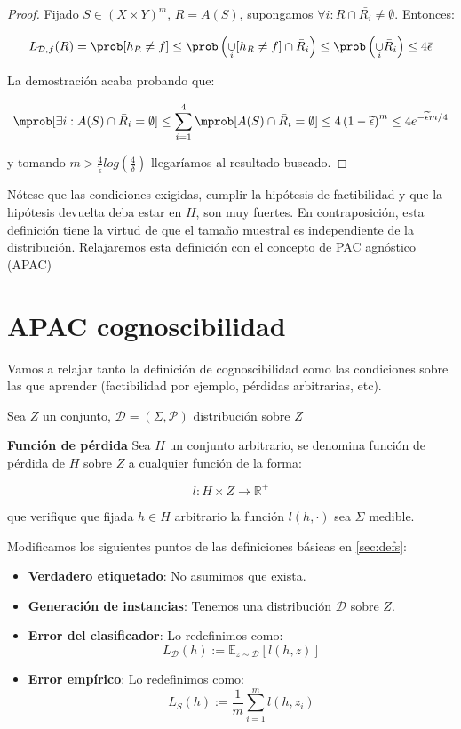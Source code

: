 \begin{example}
\begin{proof}
    Fijado $S\in (X\times Y)^m$, $R=A(S)$, supongamos $\forall i : R \cap \bar{R_i} \neq \emptyset$. Entonces:

    \[L_{\mathcal{D},f}(R) = \prob [h_R \neq f] \le \prob 
    \left(\underset{i}{\cup} [h_R \neq f] \cap \bar{R}_i\right) \le \prob \left(\underset{i}{\cup} 
    \bar{R}_i\right) \le 4 \bar{\epsilon}\]

    La demostración acaba probando que:

    \[\mprob [\exists i : A(S)\cap \bar{R}_i = \emptyset] \le \sum_{i=1}^4 
    \mprob[A(S)\cap \bar{R}_i = \emptyset] \le 4 \left(1-\widetilde{\epsilon} \right)^m \le 4e^{-\widetilde{\epsilon}m/4}\]

    y tomando $m > \frac{4}{\widetilde{\epsilon}} log \left( \frac{4}{\delta} \right)$ llegaríamos al resultado buscado.
    \end{proof}
\end{example}


Nótese que las condiciones exigidas, cumplir la hipótesis de factibilidad y que la hipótesis devuelta deba estar en $H$, 
son muy fuertes. En contraposición, esta definición tiene la virtud de que el tamaño muestral es independiente de la 
distribución. Relajaremos esta definición con el concepto de PAC agnóstico (APAC)


\section{APAC cognoscibilidad}

Vamos a relajar tanto la definición de cognoscibilidad como las condiciones sobre las que aprender 
(factibilidad por ejemplo, pérdidas arbitrarias, etc).

Sea $Z$ un conjunto, $\mathcal{D} = (\Sigma, \mathcal{P})$ distribución sobre $Z$

\begin{definition} \textbf{Función de pérdida}
Sea $H$ un conjunto arbitrario, se denomina función de pérdida de $H$ sobre $Z$ a cualquier función de la 
forma:

\[l : H \times Z \rightarrow \mathbb{R}^{+}\]

que verifique que fijada $h\in H$ arbitrario la función $l(h, \cdot)$ sea $\Sigma$ medible.
\end{definition}

Modificamos los siguientes puntos de las definiciones básicas en \ref{sec:defs}:

\begin{itemize}
  \item \textbf{Verdadero etiquetado}: No asumimos que exista.

  \item \textbf{Generación de instancias}: Tenemos una distribución $\mathcal{D}$ sobre $Z$.
  \item \textbf{Error del clasificador}: Lo redefinimos como:
  \[L_{\mathcal{D}}(h) :=  \mathbb{E}_{z\sim \mathcal{D}}[l(h,z)]\]
  
  \item \textbf{Error empírico}: Lo redefinimos como:
  \[L_{S} (h) := \frac{1}{m} \sum_{i=1}^m l(h,z_i)\]
\end{itemize}

